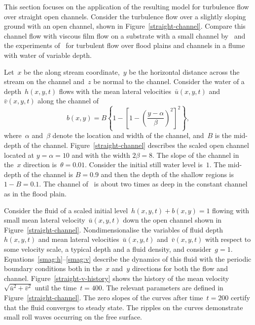 \documentclass[12pt,a5paper]{article}
\newcommand{\uu}{{\bar u}}
\newcommand{\vv}{{\bar v}}
\begin{document}
This section focuses on the application of the resulting model for turbulence flow over straight open channels. Consider the turbulence flow over a slightly sloping ground with an open channel, shown in Figure~\ref{straight-channel}. Compare this channel flow with viscous film flow on a substrate with a small channel by~\cite{Robertsli2006} and the experiments of~\cite{Bousmar2002,Bousmar2003a} for turbulent flow over flood plains and channels in a flume with water of variable depth.
 
 Let~$x$ be the along stream coordinate,~$y$ be the horizontal distance across the stream on the channel and~$z$ be normal to the channel. Consider the water of a depth~$h(x,y,t)$ flows with the mean lateral velocities~$\bar u(x,y,t)$ and~$\bar v(x,y,t)$ along the channel of
\begin{equation}
b(x,y)=B\left\{1-\left[1-\left(\frac{y-\alpha}{\beta}\right)^2\right]^2\right\},\label{bed:straight}
\end{equation}
where~$\alpha$ and~$\beta$ denote the location and width of the channel, and~$B$ is the mid-depth of the channel. Figure~\ref{straight-channel} describes the scaled open channel located at $y=\alpha=10$ and with the width $2\beta=8$. The slope of the channel in the~$x$ direction is~$\theta=0.01$. Consider the initial still water level is~$1$. The mid-depth of the channel is $B=0.9$ and then the depth of the shallow regions is $1-B=0.1$.
The channel of~\cite{Bousmar2002} is about two times as deep in the constant channel as in the flood plain.

Consider the fluid of a scaled initial level~$h(x,y,t)+b(x,y)=1$ flowing with small mean lateral velocity~$\uu(x,y,t)$ down the open channel shown in Figure~\ref{straight-channel}. Nondimensionalise the variables of fluid depth~$h(x,y,t)$ and mean lateral velocities~$\uu(x,y,t)$ and~$\vv(x,y,t)$ with respect to some velocity scale, a typical depth and a fluid density, and consider~$g=1$. Equations~\eqref{smag:h}--\eqref{smag:v} describe the dynamics of this fluid with the periodic boundary conditions both in the~$x$ and~$y$ directions for both the flow and channel. Figure~\ref{straight-v-history} shows the history of the mean velocity~$\sqrt{\uu^2+\vv^2}$ until the time~$t=400$. The relevant parameters are defined in Figure~\ref{straight-channel}. The zero slopes of the curves after time~$t=200$ certify that the fluid converges to steady state. The ripples on the curves demonstrate small roll waves occurring on the free surface. 
\end{document}
